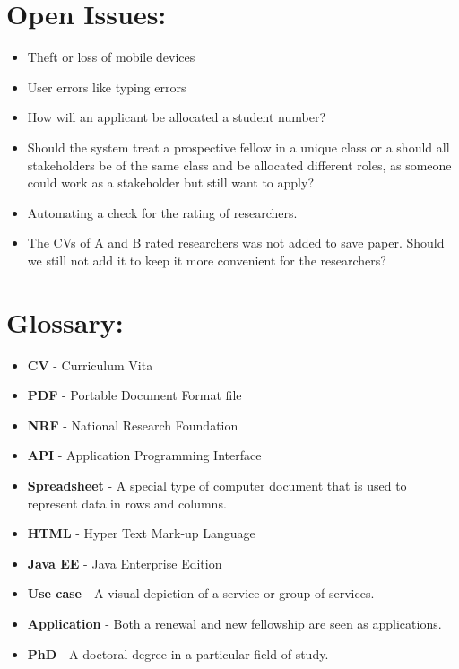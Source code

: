 \documentclass[12pt]{article}
\begin{document}
\newpage	
\section{Open Issues:} %
\vspace{0.2in}

\begin{itemize}
\item Theft or loss of mobile devices
\item User errors like typing errors
\item How will an applicant be allocated a student number?
\item Should the system treat a prospective fellow in a unique class or a should all stakeholders be of the same class and be allocated different roles, as someone could work as a stakeholder but still want to apply?
\item Automating a check for the rating of researchers.
\item The CVs of A and B rated researchers was not added to save paper. Should we still not add it to keep it more convenient for the researchers?
\end{itemize}


\vspace{0.5in}

\newpage
\section{Glossary:} %
\vspace{0.2in}

\begin{itemize}


\item \textbf{CV} - Curriculum Vita
\item \textbf{PDF} - Portable Document Format file
\item \textbf{NRF} - National Research Foundation
\item \textbf{API} - Application Programming Interface
\item \textbf{Spreadsheet} - A special type of computer document that is used to represent data in rows and columns. 
\item \textbf{HTML} - Hyper Text Mark-up Language
\item \textbf{Java EE} - Java Enterprise Edition
\item \textbf{Use case} - A visual depiction of a service or group of services.
\item \textbf{Application} - Both a renewal and new fellowship are seen as applications.
\item \textbf{PhD} - A doctoral degree in a particular field of study. 


\end{itemize}	


\vspace{0.5in}
\end{document}
